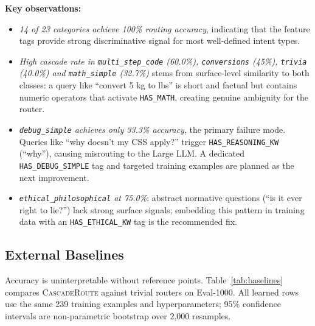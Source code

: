 \documentclass{article}
\newcommand{\system}{\textsc{CascadeRoute}}
\begin{document}
\textbf{Key observations:}
\begin{itemize}
    \item \emph{14 of 23 categories achieve 100\% routing accuracy}, indicating
          that the feature tags provide strong discriminative signal for most
          well-defined intent types.
    \item \emph{High cascade rate in \texttt{multi\_step\_code} (60.0\%),
          \texttt{conversions} (45\%), \texttt{trivia} (40.0\%) and
          \texttt{math\_simple} (32.7\%)} stems from surface-level similarity
          to both classes: a query like ``convert 5 kg to lbs'' is short and
          factual but contains numeric operators that activate
          \texttt{HAS\_MATH}, creating genuine ambiguity for the router.
    \item \emph{\texttt{debug\_simple} achieves only 33.3\% accuracy}, the
          primary failure mode. Queries like ``why doesn't my CSS apply?''
          trigger \texttt{HAS\_REASONING\_KW} (``why''), causing
          misrouting to the Large LLM. A dedicated \texttt{HAS\_DEBUG\_SIMPLE}
          tag and targeted training examples are planned as the next improvement.
    \item \emph{\texttt{ethical\_philosophical} at 75.0\%}: abstract
          normative questions (``is it ever right to lie?'') lack strong
          surface signals; embedding this pattern in training data
          with an \texttt{HAS\_ETHICAL\_KW} tag is the recommended fix.
\end{itemize}

\subsection{External Baselines}
\label{sec:baselines}

Accuracy is uninterpretable without reference points. Table~\ref{tab:baselines}
compares \system{} against trivial routers on Eval-1000. All learned rows use
the same 239 training examples and hyperparameters; 95\% confidence intervals
are non-parametric bootstrap over 2{,}000 resamples.
\end{document}
